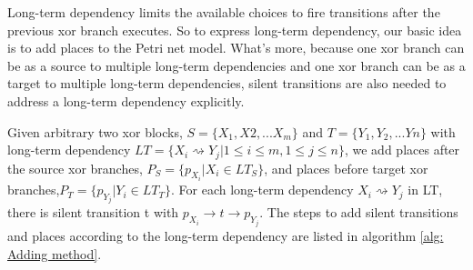 Long-term dependency limits the available choices to fire transitions after the previous xor branch executes. So to express long-term dependency, our basic idea is to add places to the Petri net model. What's more, because one xor branch can be as a source to multiple long-term dependencies and one xor branch can be as a target to multiple long-term dependencies, silent transitions are also needed to address a long-term dependency explicitly. 


Given arbitrary two xor blocks, $S=\{X_1,X2,...X_m\}$ and $T=\{Y_1,Y_2,...Yn\}$ with long-term dependency $LT=\{X_i \rightsquigarrow Y_j \vert 1 \leq i \leq m, 1 \leq j \leq n \}$, we add places after the source xor branches,  $P_S=\{p_{X_i} \vert X_i \in LT_{S} \}$, and places before target xor branches,$P_T=\{p_{Y_j} \vert Y_i \in LT_{T} \}$. For each long-term dependency $X_{i} \rightsquigarrow Y_{j}$ in LT, there is silent transition t with $p_{X_i} \rightarrow t \rightarrow p_{Y_{j}}$. The steps to add silent transitions and places according to the long-term dependency are listed in algorithm \ref{alg: Adding method}.

